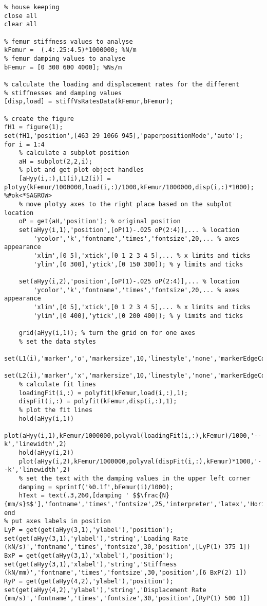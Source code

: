 \begin{lstlisting}
% house keeping
close all
clear all

% femur stiffness values to analyse
kFemur =  (.4:.25:4.5)*1000000; %N/m
% femur damping values to analyse
bFemur = [0 300 600 4000]; %Ns/m

% calculate the loading and displacement rates for the different
% stiffnesses and damping values
[disp,load] = stiffVsRatesData(kFemur,bFemur);

% create the figure
fH1 = figure(1);
set(fH1,'position',[463 29 1066 945],'paperpositionMode','auto');
for i = 1:4
    % calculate a subplot position
    aH = subplot(2,2,i);
    % plot and get plot object handles
    [aHyy(i,:),L1(i),L2(i)] = plotyy(kFemur/1000000,load(i,:)/1000,kFemur/1000000,disp(i,:)*1000); %#ok<*SAGROW>
    % move plotyy axes to the right place based on the subplot location
    oP = get(aH,'position'); % original position
    set(aHyy(i,1),'position',[oP(1)-.025 oP(2:4)],... % location
        'ycolor','k','fontname','times','fontsize',20,... % axes appearance
        'xlim',[0 5],'xtick',[0 1 2 3 4 5],... % x limits and ticks
        'ylim',[0 300],'ytick',[0 150 300]); % y limits and ticks
    
    set(aHyy(i,2),'position',[oP(1)-.025 oP(2:4)],... % location
        'ycolor','k','fontname','times','fontsize',20,... % axes appearance
        'xlim',[0 5],'xtick',[0 1 2 3 4 5],... % x limits and ticks
        'ylim',[0 400],'ytick',[0 200 400]); % y limits and ticks
    
    grid(aHyy(i,1)); % turn the grid on for one axes
    % set the data styles
    set(L1(i),'marker','o','markersize',10,'linestyle','none','markerEdgeColor','k','lineWidth',2)
    set(L2(i),'marker','x','markersize',10,'linestyle','none','markerEdgeColor','k','lineWidth',2)
    % calculate fit lines
    loadingFit(i,:) = polyfit(kFemur,load(i,:),1);
    dispFit(i,:) = polyfit(kFemur,disp(i,:),1);
    % plot the fit lines
    hold(aHyy(i,1))
    plot(aHyy(i,1),kFemur/1000000,polyval(loadingFit(i,:),kFemur)/1000,'--k','linewidth',2)
    hold(aHyy(i,2))
    plot(aHyy(i,2),kFemur/1000000,polyval(dispFit(i,:),kFemur)*1000,'--k','linewidth',2)
    % set the text with the damping values in the upper left corner
    damping = sprintf('%0.1f',bFemur(i)/1000);
    hText = text(.3,260,[damping ' $$\frac{N}{mm/s}$$'],'fontname','times','fontsize',25,'interpreter','latex','HorizontalAlignment','left','backgroundcolor','w');
end
% put axes labels in position
LyP = get(get(aHyy(3,1),'ylabel'),'position');
set(get(aHyy(3,1),'ylabel'),'string','Loading Rate (kN/s)','fontname','times','fontsize',30,'position',[LyP(1) 375 1])
BxP = get(get(aHyy(3,1),'xlabel'),'position');
set(get(aHyy(3,1),'xlabel'),'string','Stiffness (kN/mm)','fontname','times','fontsize',30,'position',[6 BxP(2) 1])
RyP = get(get(aHyy(4,2),'ylabel'),'position');
set(get(aHyy(4,2),'ylabel'),'string','Displacement Rate (mm/s)','fontname','times','fontsize',30,'position',[RyP(1) 500 1])


\end{lstlisting}
